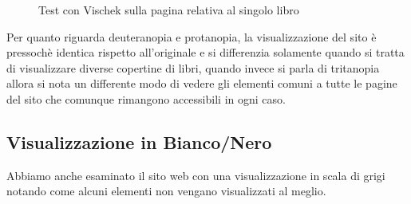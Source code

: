 \begin{figure}[H]
\begin{minipage}{0.45\textwidth}
\end{minipage}
\caption{Test con Vischek sulla pagina relativa al singolo libro}\label{multiavp}
\end{figure}

Per quanto riguarda deuteranopia e protanopia, la visualizzazione del sito è
pressochè identica rispetto all'originale e si differenzia solamente quando si
tratta di visualizzare diverse copertine di libri, quando invece si parla di
tritanopia allora si nota un differente modo di vedere gli elementi comuni a
tutte le pagine del sito che comunque rimangono accessibili in ogni caso.

\subsection{Visualizzazione in Bianco/Nero} %
Abbiamo anche esaminato il sito web con una visualizzazione in scala di grigi notando come alcuni elementi non vengano visualizzati al meglio.

